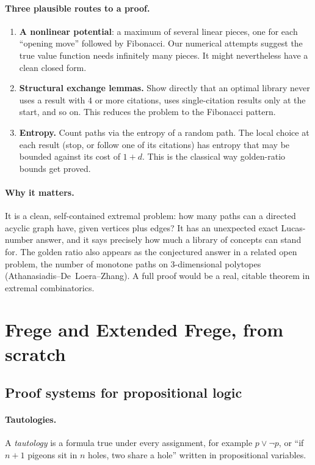 \documentclass[11pt]{article}
\begin{document}
\paragraph{Three plausible routes to a proof.}
\begin{enumerate}
\item \textbf{A nonlinear potential}: a maximum of several linear pieces, one for each
  ``opening move'' followed by Fibonacci. Our numerical attempts suggest the true value
  function needs infinitely many pieces. It might nevertheless have a clean closed form.
\item \textbf{Structural exchange lemmas.} Show directly that an optimal library never
  uses a result with $4$ or more citations, uses single-citation results only at the
  start, and so on. This reduces the problem to the Fibonacci pattern.
\item \textbf{Entropy.} Count paths via the entropy of a random path. The local choice at
  each result (stop, or follow one of its citations) has entropy that may be bounded
  against its cost of $1+d$. This is the classical way golden-ratio bounds get proved.
\end{enumerate}

\paragraph{Why it matters.} It is a clean, self-contained extremal problem: how many paths
can a directed acyclic graph have, given vertices plus edges? It has an unexpected exact
Lucas-number answer, and it says precisely how much a library of concepts can stand for.
The golden ratio also appears as the conjectured answer in a related open problem, the
number of monotone paths on 3-dimensional polytopes (Athanasiadis--De~Loera--Zhang). A full
proof would be a real, citable theorem in extremal combinatorics.

\section{Frege and Extended Frege, from scratch}

\subsection{Proof systems for propositional logic}

\paragraph{Tautologies.} A \emph{tautology} is a formula true under every assignment, for
example $p\lor\lnot p$, or ``if $n+1$ pigeons sit in $n$ holes, two share a hole'' written
in propositional variables.
\end{document}
